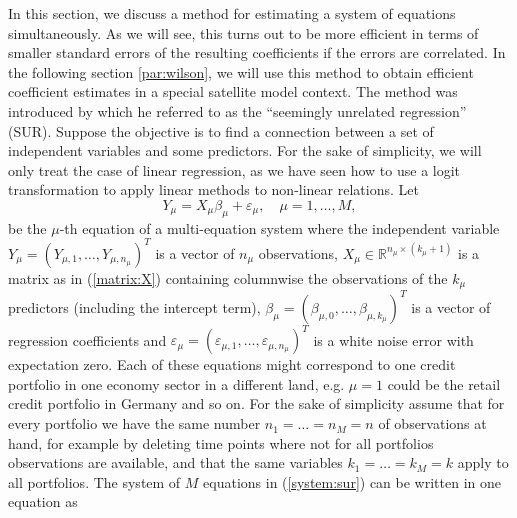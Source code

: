 \documentclass[a4paper, 11pt]{scrreprt}
\newcommand{\RR}{\mathbb{R}}
\begin{document}
In this section, we discuss a method for estimating a system of equations simultaneously. As we will see, this turns out to be more efficient in terms of smaller standard errors of the resulting coefficients if the errors are correlated. 
In the following section \ref{par:wilson}, we will use this method to obtain efficient coefficient estimates in a special satellite model context.
The method was introduced by \textcite{zellner1962efficient} which he referred to as the ``seemingly unrelated regression'' (SUR). 
Suppose the objective is to find a connection between a set of independent variables and some predictors. For the sake of simplicity, we will only treat the case of linear regression, as we have seen how to use a logit transformation to apply linear methods to non-linear relations.
Let 
\begin{equation}\label{system:sur}
 Y_\mu = X_\mu \beta_\mu + \varepsilon_\mu, \quad \mu = 1,\ldots,M,
\end{equation}
be the $\mu$-th equation of a multi-equation system where the independent variable \linebreak 
$Y_\mu = (Y_{\mu,1}, \ldots, Y_{\mu,n_\mu})^T$ is a vector of $n_\mu$ observations, $X_\mu \in \RR^{n_\mu \times (k_\mu +1)}$ is a matrix as in (\ref{matrix:X}) containing columnwise the observations of the $k_\mu$ predictors (including the intercept term), $\beta_\mu = (\beta_{\mu,0}, \ldots, \beta_{\mu,k_\mu})^T$ is a vector of regression coefficients and
$\varepsilon_\mu = (\varepsilon_{\mu,1}, \ldots, \varepsilon_{\mu,n_\mu})^T$ is a white noise error with expectation zero.
Each of these equations might correspond to one credit portfolio in one economy sector in a different land, e.g. $\mu = 1$ could be the retail credit portfolio in Germany and so on. 
For the sake of simplicity assume that for every portfolio we have the same number $n_1 = \ldots = n_M = n$ of observations at hand, for example by deleting time points where not for all portfolios observations are available, and that the same variables $k_1 = \ldots = k_M = k$ apply to all portfolios.
The system of $M$ equations in (\ref{system:sur}) can be written in one equation as
\end{document}
